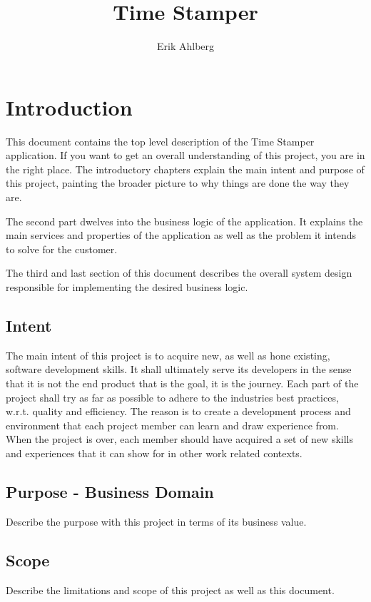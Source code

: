 \documentclass{report}
\begin{document}
\title{Time Stamper}
\author{Erik Ahlberg}

\maketitle

\tableofcontents

\newpage

\chapter{Introduction}
This document contains the top level description of the Time Stamper application. If you want to get an overall understanding of this project, you are in the right place. The introductory chapters explain the main intent and purpose of this project, painting the broader picture to why things are done the way they are.

The second part dwelves into the business logic of the application. It explains the main services and properties of the application as well as the problem it intends to solve for the customer.

The third and last section of this document describes the overall system design responsible for implementing the desired business logic.

\section{Intent}
The main intent of this project is to acquire new, as well as hone existing, software development skills. It shall ultimately serve its developers in the sense that it is not the end product that is the goal, it is the journey. Each part of the project shall try as far as possible to adhere to the industries best practices, w.r.t. quality and efficiency. The reason is to create a development process and environment that each project member can learn and draw experience from. When the project is over, each member should have acquired a set of new skills and experiences that it can show for in other work related contexts.

\section{Purpose - Business Domain}
Describe the purpose with this project in terms of its business value.

\section{Scope}
Describe the limitations and scope of this project as well as this document.
\end{document}
